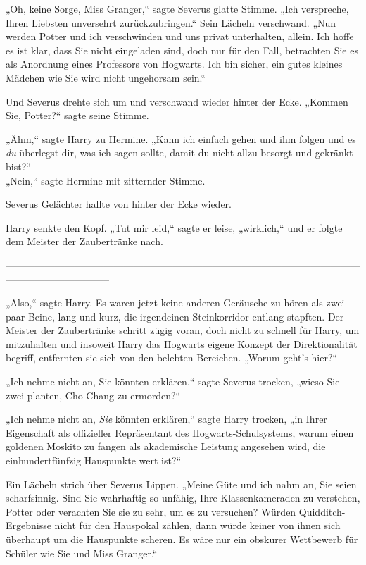 {„Oh, keine Sorge, Miss Granger,“ sagte Severus glatte Stimme. „Ich verspreche, Ihren Liebsten unversehrt zurückzubringen.“ Sein Lächeln verschwand. „Nun werden Potter und ich verschwinden und uns privat unterhalten, allein. Ich hoffe es ist klar, dass Sie nicht eingeladen sind, doch nur für den Fall, betrachten Sie es als Anordnung eines Professors von Hogwarts. Ich bin sicher, ein gutes kleines Mädchen wie Sie wird nicht ungehorsam sein.“

Und Severus drehte sich um und verschwand wieder hinter der Ecke. „Kommen Sie, Potter?“ sagte seine Stimme.

„Ähm,“ sagte Harry zu Hermine. „Kann ich einfach gehen und ihm folgen und es \emph{du} überlegst dir, was ich sagen sollte, damit du nicht allzu besorgt und gekränkt bist?“\\ „Nein,“ sagte Hermine mit zitternder Stimme.

Severus Gelächter hallte von hinter der Ecke wieder.

Harry senkte den Kopf. „Tut mir leid,“ sagte er leise, „wirklich,“ und er folgte dem Meister der Zaubertränke nach.

--------------------------------------------------------------------------------------------------------------------------------------------

„Also,“ sagte Harry. Es waren jetzt keine anderen Geräusche zu hören als zwei paar Beine, lang und kurz, die irgendeinen Steinkorridor entlang stapften. Der Meister der Zaubertränke schritt zügig voran, doch nicht zu schnell für Harry, um mitzuhalten und insoweit Harry das Hogwarts eigene Konzept der Direktionalität begriff, entfernten sie sich von den belebten Bereichen. „Worum geht's hier?“

„Ich nehme nicht an, Sie könnten erklären,“ sagte Severus trocken, „wieso Sie zwei planten, Cho Chang zu ermorden?“

„Ich nehme nicht an, \emph{Sie} könnten erklären,“ sagte Harry trocken, „in Ihrer Eigenschaft als offizieller Repräsentant des Hogwarts-Schulsystems, warum einen goldenen Moskito zu fangen als akademische Leistung angesehen wird, die einhundertfünfzig Hauspunkte wert ist?“

Ein Lächeln strich über Severus Lippen. „Meine Güte und ich nahm an, Sie seien scharfsinnig. Sind Sie wahrhaftig so unfähig, Ihre Klassenkameraden zu verstehen, Potter oder verachten Sie sie zu sehr, um es zu versuchen? Würden Quidditch-Ergebnisse nicht für den Hauspokal zählen, dann würde keiner von ihnen sich überhaupt um die Hauspunkte scheren. Es wäre nur ein obskurer Wettbewerb für Schüler wie Sie und Miss Granger.“

}
